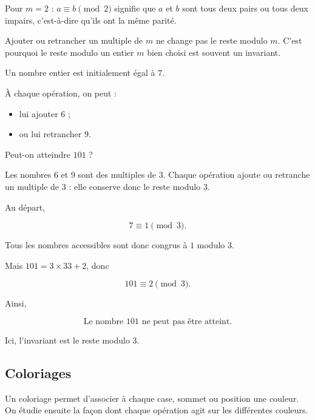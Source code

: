 \documentclass[11pt]{article}
\begin{document}
Pour \(m=2\) : \(a\equiv b\pmod 2\) signifie que \(a\) et \(b\) sont tous deux
pairs ou tous deux impairs, c'est-à-dire qu'ils ont la même parité.

Ajouter ou retrancher un multiple de \(m\) ne change pas le reste modulo \(m\).
C'est pourquoi le reste modulo un entier \(m\) bien choisi est souvent un
invariant.

\begin{exemple}\label{exm:reste-modulo-3}
Un nombre entier est initialement égal à \(7\).

À chaque opération, on peut :

\begin{itemize}
    \item lui ajouter \(6\) ;
    \item ou lui retrancher \(9\).
\end{itemize}

Peut-on atteindre \(101\) ?
\end{exemple}

\begin{solution}
Les nombres \(6\) et \(9\) sont des multiples de \(3\). Chaque opération
ajoute ou retranche un multiple de \(3\) : elle conserve donc le reste
modulo \(3\).

Au départ,

\[
7\equiv 1\pmod 3.
\]

Tous les nombres accessibles sont donc congrus à \(1\) modulo \(3\).

Mais \(101=3\times33+2\), donc

\[
101\equiv 2\pmod 3.
\]

Ainsi,

\[
\boxed{\text{Le nombre \(101\) ne peut pas être atteint.}}
\]

Ici, l'invariant est le reste modulo \(3\).
\end{solution}

\subsection{Coloriages}\label{sec:coloriages}

Un coloriage permet d'associer à chaque case, sommet ou position une couleur.
On étudie ensuite la façon dont chaque opération agit sur les différentes
couleurs.
\end{document}
